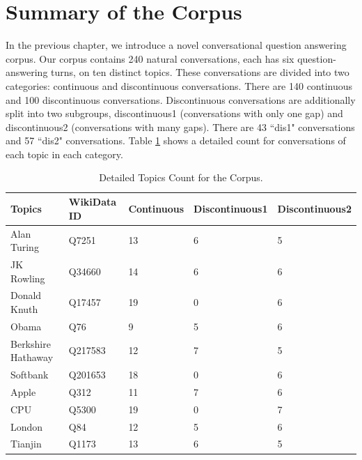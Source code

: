 \documentclass[bsc,frontabs,twoside,singlespacing,parskip,deptreport]{infthesis}     %
\begin{document}
\section{Summary of the Corpus}

In the previous chapter, we introduce a novel conversational question answering corpus. Our corpus contains 240 natural conversations, each has six question-answering turns, on ten distinct topics. These conversations are divided into two categories: continuous and discontinuous conversations. There are 140 continuous and 100 discontinuous conversations. Discontinuous conversations are additionally split into two subgroups, discontinuous1 (conversations with only one gap) and discontinuous2 (conversations with many gaps). There are 43 ``dis1" conversations and 57 ``dis2" conversations. Table \ref{tab:topiccount} shows a detailed count for conversations of each topic in each category.

\begin{table}[]
\begin{tabular}{|l|l|l|l|l|}
\hline
Topics             & WikiData ID & Continuous & Discontinuous1 & Discontinuous2 \\ \hline
Alan Turing        & Q7251       & 13         & 6              & 5              \\ \hline
JK Rowling          & Q34660      & 14         & 6              & 6              \\ \hline
Donald Knuth       & Q17457      & 19         & 0              & 6              \\ \hline
Obama              & Q76         & 9          & 5              & 6              \\ \hline
Berkshire Hathaway & Q217583     & 12         & 7              & 5              \\ \hline
Softbank           & Q201653     & 18         & 0              & 6              \\ \hline
Apple              & Q312        & 11         & 7              & 6              \\ \hline
CPU                & Q5300       & 19         & 0              & 7              \\ \hline
London             & Q84         & 12         & 5              & 6              \\ \hline
Tianjin            & Q1173       & 13         & 6              & 5              \\ \hline
\end{tabular}
\caption{Detailed Topics Count for the Corpus.}
\label{tab:topiccount}
\end{table}
\end{document}
